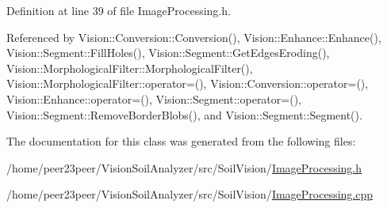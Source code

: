 Definition at line 39 of file Image\+Processing.\+h.



Referenced by Vision\+::\+Conversion\+::\+Conversion(), Vision\+::\+Enhance\+::\+Enhance(), Vision\+::\+Segment\+::\+Fill\+Holes(), Vision\+::\+Segment\+::\+Get\+Edges\+Eroding(), Vision\+::\+Morphological\+Filter\+::\+Morphological\+Filter(), Vision\+::\+Morphological\+Filter\+::operator=(), Vision\+::\+Conversion\+::operator=(), Vision\+::\+Enhance\+::operator=(), Vision\+::\+Segment\+::operator=(), Vision\+::\+Segment\+::\+Remove\+Border\+Blobs(), and Vision\+::\+Segment\+::\+Segment().



The documentation for this class was generated from the following files\+:\begin{DoxyCompactItemize}
\item 
/home/peer23peer/\+Vision\+Soil\+Analyzer/src/\+Soil\+Vision/\hyperlink{_image_processing_8h}{Image\+Processing.\+h}\item 
/home/peer23peer/\+Vision\+Soil\+Analyzer/src/\+Soil\+Vision/\hyperlink{_image_processing_8cpp}{Image\+Processing.\+cpp}\end{DoxyCompactItemize}
